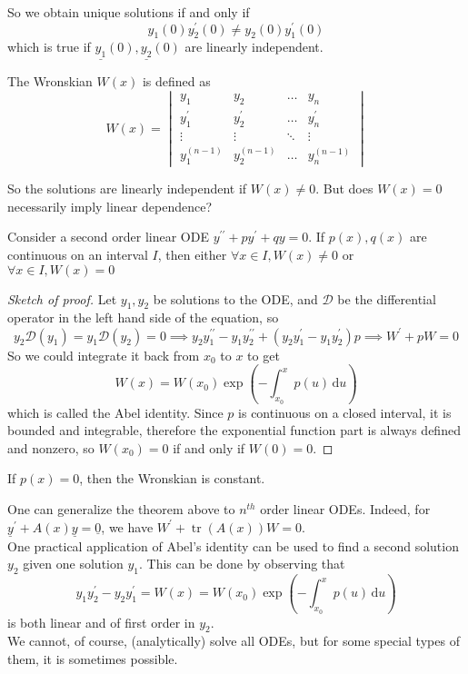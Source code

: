 So we obtain unique solutions if and only if
$$y_1(0)y_2^\prime(0)\neq y_2(0)y_1^\prime(0)$$
which is true if $\underline{y_1}(0),\underline{y_2}(0)$ are linearly independent.
\begin{definition}
    The Wronskian $W(x)$ is defined as
    $$W(x)=
    \begin{vmatrix}
        y_1&y_2&\dots&y_n\\
        y_1^\prime&y_2^\prime&\dots&y_n^\prime\\
        \vdots&\vdots&\ddots&\vdots\\
        y_1^{(n-1)}&y_2^{(n-1)}&\dots&y_n^{(n-1)}
    \end{vmatrix}
    $$
\end{definition}
So the solutions are linearly independent if $W(x)\neq 0$.
But does $W(x)=0$ necessarily imply linear dependence?
\begin{theorem}
    Consider a second order linear ODE $y^{\prime\prime}+py^\prime+qy=0$.
    If $p(x),q(x)$ are continuous on an interval $I$, then either $\forall x\in I, W(x)\neq 0$ or $\forall x\in I, W(x)=0$
\end{theorem}
\begin{proof}[Sketch of proof]
    Let $y_1,y_2$ be solutions to the ODE, and $\mathscr D$ be the differential operator in the left hand side of the equation, so
    $$y_2\mathscr{D}(y_1)=y_1\mathscr{D}(y_2)=0\implies y_2y_1^{\prime\prime}-y_1y_2^{\prime\prime}+(y_2y_1^\prime-y_1y_2^\prime)p\implies W^\prime+pW=0$$
    So we could integrate it back from $x_0$ to $x$ to get
    $$W(x)=W(x_0)\exp\left(-\int_{x_0}^xp(u)\,\mathrm du\right)$$
    which is called the Abel identity.
    Since $p$ is continuous on a closed interval, it is bounded and integrable, therefore the exponential function part is always defined and nonzero, so $W(x_0)=0$ if and only if $W(0)=0$.
\end{proof}
\begin{corollary}
    If $p(x)=0$, then the Wronskian is constant.
\end{corollary}
One can generalize the theorem above to $n^{th}$ order linear ODEs.
Indeed, for $\underline{y}^\prime+A(x)\underline{y}=\underline{0}$, we have $W^\prime+\operatorname{tr}(A(x))W=0$.\\
One practical application of Abel's identity can be used to find a second solution $y_2$ given one solution $y_1$.
This can be done by observing that
$$y_1y_2^\prime-y_2y_1^\prime=W(x)=W(x_0)\exp\left(-\int_{x_0}^xp(u)\,\mathrm du\right)$$
is both linear and of first order in $y_2$.\\
We cannot, of course, (analytically) solve all ODEs, but for some special types of them, it is sometimes possible.
